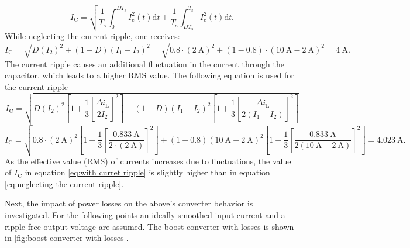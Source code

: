 \begin{solutionblock}
\begin{equation}
        I_\mathrm{C}=\sqrt{\frac{1}{T_\mathrm{s}}\int_{0}^{DT_\mathrm{s}}I_\mathrm{c}^2(t)\mathrm{d}t+\frac{1}{T_\mathrm{s}}\int_{DT_\mathrm{s}}^{T_\mathrm{s}}I_\mathrm{c}^2(t)\mathrm{d}t}.
     \end{equation}
     While neglecting the current ripple, one receives:
     \begin{equation}
        I_\mathrm{C}=\sqrt{D (I_\mathrm{2})^2+(1-D)(I_\mathrm{1}-I_\mathrm{2})^2}=\sqrt{0.8\cdot (\SI{2}{\ampere})^2+(1-0.8)\cdot(\SI{10}{\ampere}-\SI{2}{\ampere})^2} = \SI{4}{\ampere}. \label{eq:neglecting the current ripple}
     \end{equation}
     The current ripple causes an additional fluctuation in the current through the capacitor, which leads to a higher RMS value. The following equation is used for the current ripple
     \begin{equation}
        I_\mathrm{C}=\sqrt{D (I_\mathrm{2})^2\left[1+\frac{1}{3}\left[\frac{\Delta i_\mathrm{L}}{2I_\mathrm{2}}\right]^2\right]+(1-D)(I_\mathrm{1}-I_\mathrm{2})^2\left[1+\frac{1}{3}\left[\frac{\Delta i_\mathrm{L}}{2(I_\mathrm{1}-I_\mathrm{2})}\right]^2\right]} 
    \end{equation}
    \begin{equation}
        I_\mathrm{C}=\sqrt{0.8 \cdot (\SI{2}{\ampere})^2 \left[1+\frac{1}{3}\left[\frac{\SI{0.833}{\ampere}}{2\cdot (\SI{2}{\ampere})}\right]^2\right]+(1-0.8)(\SI{10}{\ampere}- \SI{2}{\ampere})^2\left[1+\frac{1}{3}\left[\frac{\SI{0.833}{\ampere}}{2(\SI{10}{\ampere}- \SI{2}{\ampere})}\right]^2\right]}=\SI{4.023}{\ampere}. \label{eq:with curret ripple}
    \end{equation}
    As the effective value (RMS) of currents increases due to fluctuations, the value of $ I_\mathrm{C}$ in equation \eqref{eq:with curret ripple} is slightly higher than in equation \eqref{eq:neglecting the current ripple}.
\end{solutionblock}

Next, the impact of power losses on the above's converter behavior is investigated. For the following points an ideally smoothed input current and a ripple-free output voltage are assumed. The boost converter with losses  is shown in \autoref{fig:boost converter with losses}.



